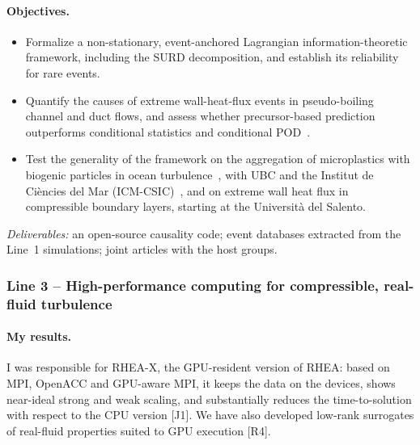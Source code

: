 \documentclass[11pt]{article}
\begin{document}
\paragraph{Objectives.}
\begin{itemize}
  \item[\textbf{O4.}] Formalize a non-stationary, event-anchored Lagrangian information-theoretic
  framework, including the SURD decomposition, and establish its reliability for rare events.
  \item[\textbf{O5.}] Quantify the causes of extreme wall-heat-flux events in pseudo-boiling
  channel and duct flows, and assess whether precursor-based prediction outperforms conditional
  statistics and conditional POD~\cite{Martin2025}.
  \item[\textbf{O6.}] Test the generality of the framework on the aggregation of microplastics
  with biogenic particles in ocean turbulence~\cite{Rahmani2022,Pizzi2024,Pizzi2026}, with UBC
  and the Institut de Ci\`encies del Mar (ICM-CSIC)~\cite{Pizzi2025}, and on extreme wall heat
  flux in compressible boundary layers, starting at the Universit\`a del Salento.
\end{itemize}
\emph{Deliverables:} an open-source causality code; event databases extracted from the Line~1
simulations; joint articles with the host groups.

\subsubsection*{Line 3 -- High-performance computing for compressible, real-fluid turbulence}

\paragraph{My results.} I was responsible for RHEA-X, the GPU-resident version of RHEA: based on
MPI, OpenACC and GPU-aware MPI, it keeps the data on the devices, shows near-ideal strong and weak
scaling, and substantially reduces the time-to-solution with respect to the CPU version [J1]. We
have also developed low-rank surrogates of real-fluid properties suited to GPU execution [R4].
\end{document}

